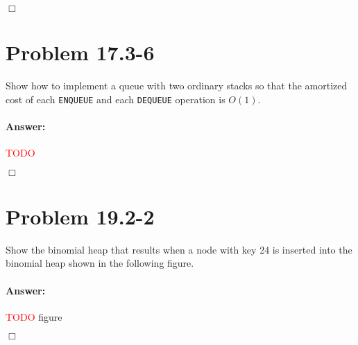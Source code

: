 \documentclass[a4paper,10pt]{article}
\newcommand{\problem}[1]{\section*{Problem #1}}
\newcommand{\answer}{\paragraph{Answer:}}
\newcommand{\qed}{\hfill \ensuremath{\Box}}
\newcommand{\todo}{\textcolor{red}{TODO}{} }
\begin{document}
\qed

\problem{17.3-6}

Show how to implement a queue with two ordinary stacks so that the amortized cost of each \texttt{ENQUEUE} and each \texttt{DEQUEUE} operation is $O(1)$.

\answer

\todo

\qed

\problem{19.2-2}

Show the binomial heap that results when a node with key 24 is inserted into the binomial heap shown in the following figure.

\answer

\todo figure

\qed
\end{document}

